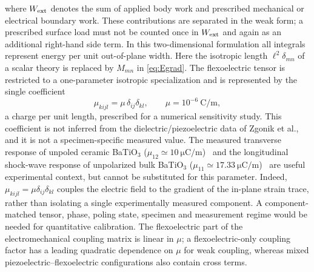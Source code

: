 where $W_{\rm ext}$ denotes the sum of applied body work and
prescribed mechanical or electrical boundary work. These contributions
are separated in the weak form; a prescribed surface load must not be
counted once in $W_{\rm ext}$ and again as an additional right-hand side
term. In this two-dimensional formulation all integrals represent
energy per unit out-of-plane width. Here the isotropic length
$\ell^2\delta_{mn}$ of a scalar theory is
replaced by $M_{mn}$ in \eqref{eq:Egrad}. The flexoelectric tensor is restricted to a one-parameter isotropic
specialization and is represented by the single coefficient
\begin{equation}
  \mu_{kijl} = \mu\,\delta_{ij}\delta_{kl},
  \qquad \mu = 10^{-6}\ \si{\coulomb\per\meter},
  \label{eq:muexplicit}
\end{equation}
a charge per unit length, prescribed for a numerical sensitivity study.
This coefficient is not inferred from the dielectric/piezoelectric data of
Zgonik et al., and it is not a specimen-specific measured value.
The measured transverse response of unpoled ceramic BaTiO$_3$
($\mu_{12}\simeq\SI{10}{\micro\coulomb\per\meter}$)~\cite{MaCross2006}
and the longitudinal shock-wave response of unpolarized bulk BaTiO$_3$
($\mu_{11}\simeq\SI{17.33}{\micro\coulomb\per\meter}$)~\cite{HuDengLiangShen2017}
are useful experimental context, but cannot be substituted for this parameter.
Indeed, $\mu_{kijl}=\mu\delta_{ij}\delta_{kl}$ couples the electric
field to the gradient of the in-plane strain trace, rather than isolating a
single experimentally measured component. A component-matched tensor,
phase, poling state, specimen and measurement regime would be needed for
quantitative calibration. The flexoelectric part of the electromechanical
coupling matrix is linear in $\mu$; a flexoelectric-only coupling factor has
a leading quadratic dependence on $\mu$ for weak coupling, whereas mixed
piezoelectric--flexoelectric configurations also contain cross terms.


